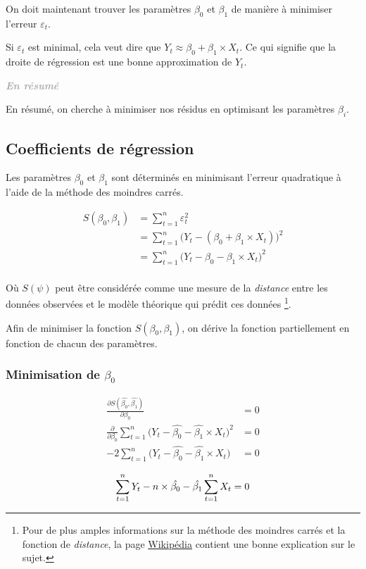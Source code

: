 \documentclass[11pt,french]{report}
\newenvironment{moreInfo}[1]
	{\begin{mdframed}
	\textcolor{darkgray}{\huge \raisebox{-3.5pt}{\faInfo} 
	\hspace{0.5cm} \large\bfseries #1}\\[5pt]
	\normalsize
	\makebox[0.1\textwidth][l]{}	
	\begin{minipage}{10cm}}
	{	\end{minipage}
	\end{mdframed}}
\begin{document}
On doit maintenant trouver les paramètres $\beta_0$ et $\beta_1$ de manière à minimiser l'erreur $\varepsilon_t$.

Si $\varepsilon_t$ est minimal, cela veut dire que $Y_t \approx \beta_0 + \beta_1\times X_t$. Ce qui signifie que la droite de régression est une bonne approximation de $Y_t$.

\begin{moreInfo}{\emph{En résumé}}
	En résumé, on cherche à minimiser nos résidus en optimisant les paramètres $\beta_i$. 
\end{moreInfo}

\subsection{Coefficients de régression}
\label{subsec:coeffreg}
Les paramètres $\beta_0$ et $\beta_1$ sont déterminés en minimisant l'erreur quadratique à l'aide de la méthode des moindres carrés.

\begin{align*}
S(\beta_0, \beta_1) &= \sum_{t=1}^n \varepsilon_t^2 \\
&= \sum_{t=1}^n \big( Y_t - (\beta_0 + \beta_1\times X_t) \big)^2 \\
&= \sum_{t=1}^n \big( Y_t - \beta_0 - \beta_1\times X_t \big)^2 \\
\end{align*}

Où $S(\psi)$ peut être considérée comme une mesure de la \emph{distance} entre les données observées et le modèle théorique qui prédit ces données \footnote{Pour de plus amples informations sur la méthode des moindres carrés et la fonction de \emph{distance}, la page \href{https://fr.wikipedia.org/wiki/Méthode_des_moindres_carrés}{Wikipédia} contient une bonne explication sur le sujet.}.

\bigskip
Afin de minimiser la fonction $S(\beta_0, \beta_1)$, on dérive la fonction partiellement en fonction de chacun des paramètres.

\subsubsection*{Minimisation de $\beta_0$}
\begin{align*}
\frac{\partial S(\hat{\beta_0}, \hat{\beta_1})}{\partial \beta_0} &= 0 \\
\frac{\partial}{\partial \beta_0} \sum_{t=1}^n \big( Y_t - \hat{\beta_0} - \hat{\beta_1}\times X_t \big)^2 &= 0 \\
-2\sum_{t=1}^n \big( Y_t - \hat{\beta_0} - \hat{\beta_1} \times X_t \big) &= 0 \\
\end{align*}
\begin{equation}
\label{eq:minimisationbeta0}
\sum_{t=1}^n Y_t - n \times \hat{\beta_0} - \hat{\beta_1} \sum_{t=1}^n X_t = 0 \\
\end{equation}
\end{document}
